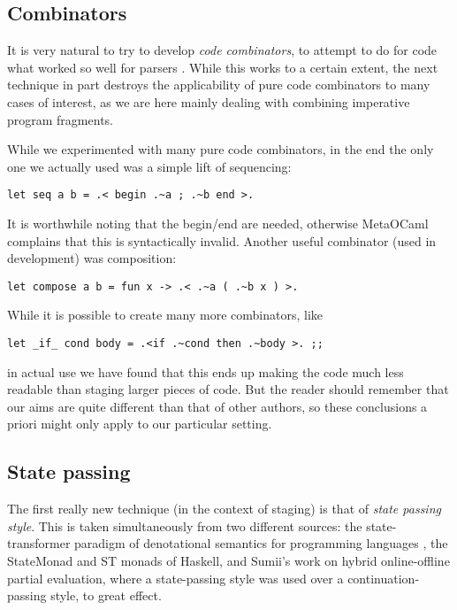 \documentclass[11pt]{elsart}
\begin{document}
\subsection{Combinators}

It is very natural to try to develop \emph{code combinators}, to attempt
to do for code what worked so well for parsers \cite{ParserCombinators}.
While this works to a certain extent, the next technique in part 
destroys the applicability of pure code combinators to many cases of interest,
as we are here mainly dealing with combining imperative program fragments.

While we experimented with many pure code combinators, in the end 
the only one we actually used was a simple lift of sequencing:

\begin{small}
\begin{verbatim}
let seq a b = .< begin .~a ; .~b end >.
\end{verbatim}
\end{small}

\noindent It is worthwhile noting that the begin/end are needed, otherwise
MetaOCaml complains that this is syntactically invalid.
Another useful combinator (used in development) was composition:

\begin{small}
\begin{verbatim}
let compose a b = fun x -> .< .~a ( .~b x ) >.
\end{verbatim}
\end{small}

\noindent While it is possible to create many more combinators, like
\begin{small}
\begin{verbatim}
let _if_ cond body = .<if .~cond then .~body >. ;;
\end{verbatim}
\end{small}
\noindent in actual use we have found that this ends up making the code
much less readable than staging larger pieces of code.  But the reader
should remember that our aims are quite different than that of other authors,
so these conclusions a priori might only apply to our particular setting.

\subsection{State passing}

The first really new technique (in the context of staging) is that
of \emph{state passing style}.  This is taken simultaneously from two
different sources: the state-transformer paradigm of denotational
semantics for programming languages \cite{DenSem}, the StateMonad
and ST monads of Haskell, and Sumii's work
\cite{sumii01hybrid}
on hybrid online-offline partial evaluation, where a state-passing style
was used over a continuation-passing style, to great effect.
\end{document}

